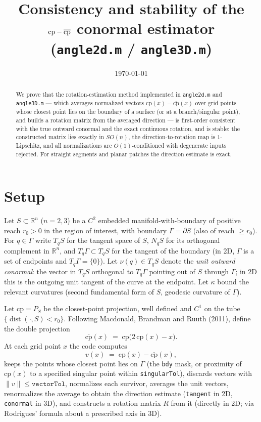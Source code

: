 \documentclass[11pt]{article}
\title{Consistency and stability of the $\cp-\cpbar$ conormal estimator\\
  \large (\texttt{angle2d.m} / \texttt{angle3D.m})}
\author{}
\date{\today}
\newcommand{\R}{\mathbb{R}}
\newcommand{\cp}{\mathrm{cp}}
\newcommand{\cpbar}{\overline{\mathrm{cp}}}
\newcommand{\dist}{\operatorname{dist}}
\newcommand{\norm}[1]{\lVert #1 \rVert}
\begin{document}
\maketitle

\begin{abstract}
We prove that the rotation-estimation method implemented in
\texttt{angle2d.m} and \texttt{angle3D.m} --- which averages normalized
vectors $\cp(x)-\cpbar(x)$ over grid points whose closest point lies on
the boundary of a surface (or at a branch/singular point), and builds a
rotation matrix from the averaged direction --- is first-order consistent
with the true outward conormal and the exact continuous rotation, and is
stable: the constructed matrix lies exactly in $SO(n)$, the
direction-to-rotation map is $1$-Lipschitz, and all normalizations are
$O(1)$-conditioned with degenerate inputs rejected. For straight
segments and planar patches the direction estimate is exact.
\end{abstract}

\section{Setup}

Let $S\subset\R^n$ ($n=2,3$) be a $C^2$ embedded manifold-with-boundary
of positive reach $r_0>0$ in the region of interest, with boundary
$\Gamma=\partial S$ (also of reach $\ge r_0$). For $q\in\Gamma$ write
$T_qS$ for the tangent space of $S$, $N_qS$ for its orthogonal
complement in $\R^n$, and $T_q\Gamma\subset T_qS$ for the tangent of the
boundary (in 2D, $\Gamma$ is a set of endpoints and $T_q\Gamma=\{0\}$).
Let $\nu(q)\in T_qS$ denote the \emph{unit outward conormal}: the vector
in $T_qS$ orthogonal to $T_q\Gamma$ pointing out of $S$ through
$\Gamma$; in 2D this is the outgoing unit tangent of the curve at the
endpoint. Let $\kappa$ bound the relevant curvatures (second fundamental
form of $S$, geodesic curvature of $\Gamma$).

Let $\cp=P_S$ be the closest-point projection, well defined and $C^1$ on
the tube $\{\dist(\cdot,S)<r_0\}$. Following Macdonald, Brandman and
Ruuth (2011), define the double projection
\[
  \cpbar(x) \;=\; \cp\bigl(2\,\cp(x)-x\bigr).
\]
At each grid point $x$ the code computes
\[
  v(x) \;=\; \cp(x) - \cpbar(x),
\]
keeps the points whose closest point lies on $\Gamma$ (the
\texttt{bdy} mask, or proximity of $\cp(x)$ to a specified singular
point within \texttt{singularTol}), discards vectors with
$\norm{v}\le\texttt{vectorTol}$, normalizes each survivor, averages the
unit vectors, renormalizes the average to obtain the direction estimate
(\texttt{tangent} in 2D, \texttt{conormal} in 3D), and constructs a
rotation matrix $R$ from it (directly in 2D; via Rodrigues' formula
about a prescribed axis in 3D).
\end{document}
